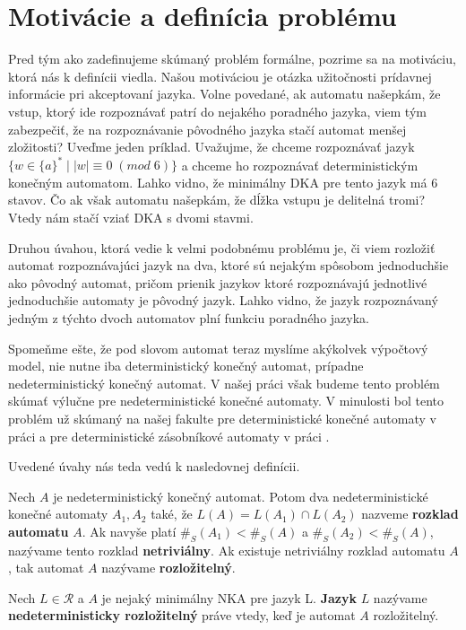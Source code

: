 \section{Motivácie a definícia problému}
Pred tým ako zadefinujeme skúmaný problém formálne, pozrime sa na motiváciu, ktorá nás k definícii viedla. Našou motiváciou je otázka užitočnosti prídavnej informácie pri akceptovaní jazyka. Volne povedané, ak automatu našepkám, že vstup, ktorý ide rozpoznávať patrí do nejakého poradného jazyka, viem tým zabezpečiť, že na rozpoznávanie pôvodného jazyka stačí automat menšej zložitosti? Uveďme jeden príklad. Uvažujme, že chceme rozpoznávať jazyk $ \lbrace w \in \lbrace a \rbrace^* \; | \; |w| \equiv 0 \; (mod \; 6) \rbrace $ a chceme ho rozpoznávať deterministickým konečným automatom. Lahko vidno, že minimálny DKA pre tento jazyk má 6 stavov. Čo ak však automatu našepkám, že dĺžka vstupu je delitelná tromi? Vtedy nám stačí vziať DKA s dvomi stavmi. 
\par
Druhou úvahou, ktorá vedie k velmi podobnému problému je, či viem rozložiť automat rozpoznávajúci jazyk na dva, ktoré sú nejakým spôsobom jednoduchšie ako pôvodný automat, pričom prienik jazykov ktoré rozpoznávajú jednotlivé jednoduchšie automaty je pôvodný jazyk. Lahko vidno, že jazyk rozpoznávaný jedným z týchto dvoch automatov plní funkciu poradného jazyka.
\par
Spomeňme ešte, že pod slovom automat teraz myslíme akýkolvek výpočtový model, nie nutne iba deterministický konečný automat, prípadne nedeterministický konečný automat. V našej práci však budeme tento problém skúmať výlučne pre nedeterministické konečné automaty. V minulosti bol tento problém už skúmaný na našej fakulte pre deterministické konečné automaty v práci \cite{Gazi} a pre deterministické zásobníkové automaty v práci \cite{Labath}.
\par Uvedené úvahy nás teda vedú k nasledovnej definícii.

\begin{definition}
Nech $ A $ je nedeterministický konečný automat. Potom dva nedeterministické konečné automaty $ A_1, A_2 $ také, že $ L(A)=L(A_1) \cap L(A_2) $ nazveme \textbf{rozklad automatu} $ A $. Ak navyše platí $ \#_S(A_1) < \#_S(A)$ a $ \#_S(A_2) < \#_S(A) $, nazývame tento rozklad \textbf{netriviálny}. Ak existuje netriviálny rozklad automatu $ A $, tak automat $ A $ nazývame \textbf{rozložitelný}.
\end{definition}

\begin{definition}
\label{def:nedeterministic_decomposability_of_language}
Nech $ L \in \mathscr{R} $ a $ A $ je nejaký minimálny NKA pre jazyk L. \textbf{Jazyk} $ L $ nazývame \textbf{nedeterministicky rozložitelný} práve vtedy, keď je automat $ A $ rozložitelný.
\end{definition}

